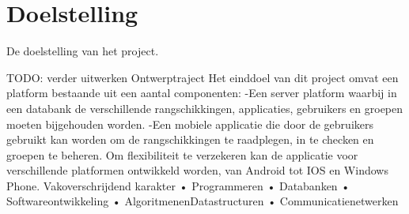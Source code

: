 
\chapter{Doelstelling}

De doelstelling van het project.




TODO: verder uitwerken
Ontwerptraject
Het einddoel van dit project omvat een platform bestaande uit een aantal componenten: -Een server platform waarbij in een databank de verschillende rangschikkingen,
applicaties, gebruikers en groepen moeten bijgehouden worden.
-Een mobiele applicatie die door de gebruikers gebruikt kan worden om de
rangschikkingen te raadplegen, in te checken en groepen te beheren.
Om flexibiliteit te verzekeren kan de applicatie voor verschillende platformen ontwikkeld worden, van Android tot IOS en Windows Phone.
Vakoverschrijdend karakter
• Programmeren
• Databanken
• Softwareontwikkeling
• AlgoritmenenDatastructuren • Communicatienetwerken